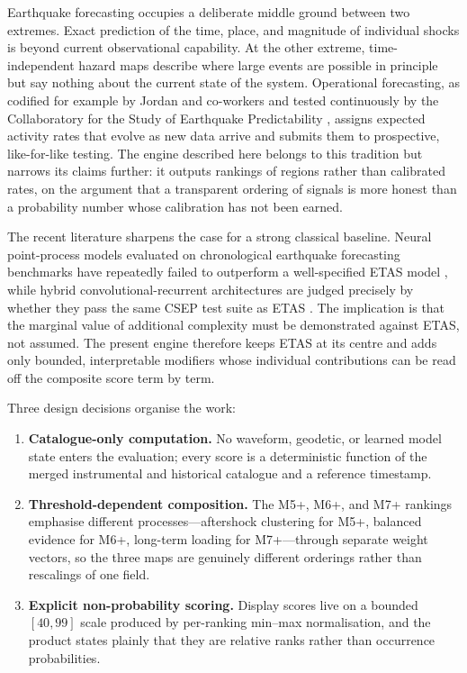 \documentclass[11pt,a4paper]{article}
\begin{document}
Earthquake forecasting occupies a deliberate middle ground between two
extremes. Exact prediction of the time, place, and magnitude of individual
shocks is beyond current observational capability. At the other extreme,
time-independent hazard maps describe where large events are possible in
principle but say nothing about the current state of the system. Operational
forecasting, as codified for example by Jordan and co-workers
\cite{jordan2011} and tested continuously by the Collaboratory for the Study
of Earthquake Predictability \cite{ziemer2022}, assigns expected activity
rates that evolve as new data arrive and submits them to prospective,
like-for-like testing. The engine described here belongs to this tradition
but narrows its claims further: it outputs rankings of regions rather than
calibrated rates, on the argument that a transparent ordering of signals is
more honest than a probability number whose calibration has not been earned.

The recent literature sharpens the case for a strong classical baseline.
Neural point-process models evaluated on chronological earthquake forecasting
benchmarks have repeatedly failed to outperform a well-specified ETAS model
\cite{stockman2026, epbench2025}, while hybrid convolutional-recurrent
architectures are judged precisely by whether they pass the same CSEP test
suite as ETAS \cite{cl-etas2023}. The implication is that the marginal value
of additional complexity must be demonstrated against ETAS, not assumed. The
present engine therefore keeps ETAS at its centre and adds only bounded,
interpretable modifiers whose individual contributions can be read off the
composite score term by term.

Three design decisions organise the work:

\begin{enumerate}[label=\textbf{(D\arabic*)},leftmargin=2.6em]
  \item \textbf{Catalogue-only computation.} No waveform, geodetic, or
  learned model state enters the evaluation; every score is a deterministic
  function of the merged instrumental and historical catalogue and a
  reference timestamp.
  \item \textbf{Threshold-dependent composition.} The M5+, M6+, and M7+
  rankings emphasise different processes---aftershock clustering for M5+,
  balanced evidence for M6+, long-term loading for M7+---through separate
  weight vectors, so the three maps are genuinely different orderings rather
  than rescalings of one field.
  \item \textbf{Explicit non-probability scoring.} Display scores live on a
  bounded $[40,99]$ scale produced by per-ranking min--max normalisation, and
  the product states plainly that they are relative ranks rather than
  occurrence probabilities.
\end{enumerate}
\end{document}
